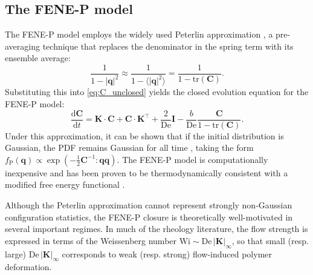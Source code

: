 \documentclass[preprint,12pt]{elsarticle}
\begin{document}
\subsection{The FENE-P model}
The FENE-P model employs the widely used Peterlin approximation \cite{Bird87}, a pre-averaging technique that replaces the denominator in the spring term with its ensemble average:
\begin{equation}
    \frac{1}{1-|\bm{q}|^2} \approx \frac{1}{1-\langle |\bm{q}|^2 \rangle} = \frac{1}{1-\mathrm{tr}(\bm{C})}.
\end{equation}
Substituting this into \eqref{eq:C_unclosed} yields the closed evolution equation for the FENE-P model:
\begin{equation}
    \frac{\mathrm{d}\bm{C}}{\mathrm{d}t}=\bm{K} \cdot \bm{C} + \bm{C} \cdot \bm{K}^\top + \frac{2}{\mathrm{De}}\bm{I} - \frac{b}{\mathrm{De}} \frac{\bm{C}}{1-\mathrm{tr}(\bm{C})}.\label{eq:fenep}
\end{equation}
Under this approximation, it can be shown that if the initial distribution is Gaussian, the PDF remains Gaussian for all time \cite{Ottinger87}, taking the form $f_{\mathrm{P}}(\bm{q}) \propto \exp(-\frac{1}{2}\bm{C}^{-1}:\bm{q}\bm{q})$. The FENE-P model is computationally inexpensive and has been proven to be thermodynamically consistent with a modified free energy functional \cite{Hu07}.

Although the Peterlin approximation cannot represent strongly non-Gaussian configuration statistics, the FENE-P closure is theoretically well-motivated in several important regimes. In much of the rheology literature, the flow strength is expressed in terms of the Weissenberg number $\mathrm{Wi}\sim \mathrm{De}\,|\bm{K}|_{\infty}$, so that small (resp. large) $\mathrm{De}\,|\bm{K}|_{\infty}$ corresponds to weak (resp. strong) flow-induced polymer deformation.
\end{document}

